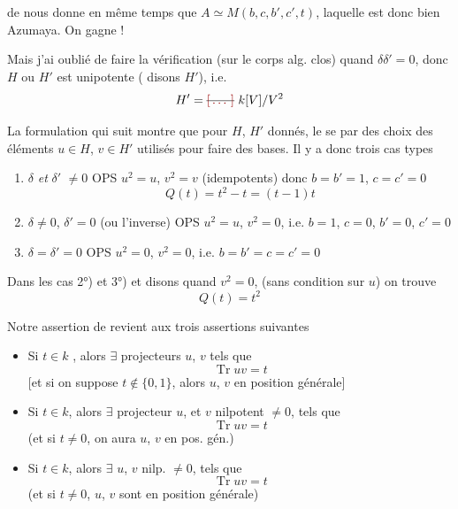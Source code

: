 \documentclass[11pt,a4paper]{article}
\begin{document}
de  nous donne en même temps que $A\simeq M(b,c,b',c',t)$, laquelle est donc bien Azumaya. On gagne !

Mais j'ai oublié de faire la vérification (sur le  corps alg. clos) quand $\delta\delta'=0$, donc $H$ ou $H'$ est \og unipotente\fg{} (\struck{\ill{}} disons $H'$), i.e.
\[ H' = \text{\struck{\ill{}}}\ k[V]/V^2 \]

La formulation qui suit montre que pour $H$, $H'$ donnés, le    se  par des choix des  éléments $u\in H$, $v\in H'$ utilisés pour faire des bases.  Il y a donc trois \og cas types\fg{}
\begin{enumerate}
\item $\delta$ \emph{et} $\delta'$ \struck{\ill{}} $\neq 0$ \qquad OPS $u^2=u$, $v^2=v$ (idempotents) donc $b=b'=1$, $c=c'=0$
\[ Q(t) = t^2 - t = (t-1)t \]
\item $\delta\neq0$, \struck{\ill{}} $\delta'=0$ (ou l'inverse) \qquad OPS $u^2=u$, $v^2=0$, i.e. $b=1$, $c=0$, $b'=0$, $c'=0$
\item $\delta=\delta'=0$ \qquad OPS $u^2=0$, $v^2=0$, i.e. $b=b'=c=c'=0$
\end{enumerate}
Dans les cas 2°) et 3°) et disons quand $v^2=0$, (sans condition sur $u$) on trouve
\[ Q(t) = t^2 \]

Notre assertion de   revient aux trois assertions suivantes
\begin{itemize}
\item[1°)] Si $t\in k$ , alors $\exists$ projecteurs $u$, $v$   tels que
\[ \operatorname{Tr} uv = t \]
[et si on suppose $t\notin\{0,1\}$, alors $u$, $v$  en \og position générale\fg{}]
\item[2°)] Si $t\in k$, alors $\exists$ projecteur  $u$, et $v$ nilpotent $\neq0$,  tels que
\[ \operatorname{Tr} uv = t \]
(et si $t\neq0$, on aura $u$, $v$ en pos. gén.)
\item[3°)] Si $t\in k$, alors $\exists$ $u$, $v$ nilp. \struck{\ill{}} $\neq0$, tels que
\[ \operatorname{Tr} uv = t \]
(et si $t\neq0$, $u$, $v$ sont en position générale)
\end{itemize}
\end{document}
